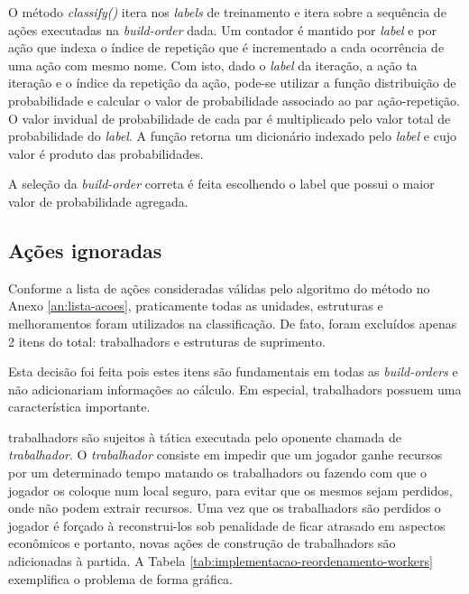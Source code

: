 O método \textit{classify()} itera nos \textit{labels} de treinamento e itera sobre a sequência de ações executadas na \textit{\gls{build-order}} dada. Um contador é mantido por \textit{label} e por ação que indexa o índice de repetição que é incrementado a cada ocorrência de uma ação com mesmo nome. Com isto, dado o \textit{label} da iteração, a ação ta iteração e o índice da repetição da ação, pode-se utilizar a função distribuição de probabilidade e calcular o valor de probabilidade associado ao par ação-repetição. O valor invidual de probabilidade de cada par é multiplicado pelo valor total de probabilidade do \textit{label}. A função retorna um dicionário indexado pelo \textit{label} e cujo valor é produto das probabilidades.

A seleção da \textit{\gls{build-order}} correta é feita escolhendo o label que possui o maior valor de probabilidade agregada.

			\subsection{Ações ignoradas}
Conforme a lista de ações consideradas válidas pelo algoritmo do método no Anexo \ref{an:lista-acoes}, praticamente todas as \glspl{unidade}, \glspl{estrutura} e \glspl{melhoramento} foram utilizados na classificação. De fato, foram excluídos apenas 2 itens do total: \glspl{trabalhador} e \glspl{estrutura} de \gls{suprimento}.

Esta decisão foi feita pois estes itens são fundamentais em todas as \textit{\glspl{build-order}} e não adicionariam informações ao cálculo. Em especial, \glspl{trabalhador} possuem uma característica importante.

\Glspl{trabalhador} são sujeitos à tática executada pelo oponente chamada de \textit{\gls{trabalhador}}. O \textit{\gls{trabalhador}} consiste em impedir que um jogador ganhe \glspl{recurso} por um determinado tempo matando os \glspl{trabalhador} ou fazendo com que o jogador os coloque num local seguro, para evitar que os mesmos sejam perdidos, onde não podem extrair \glspl{recurso}. Uma vez que os \glspl{trabalhador} são perdidos o jogador é forçado à reconstrui-los sob penalidade de ficar atrasado em aspectos econômicos e portanto, novas ações de construção de \glspl{trabalhador} são adicionadas à partida. A Tabela \ref{tab:implementacao-reordenamento-workers} exemplifica o problema de forma gráfica.

